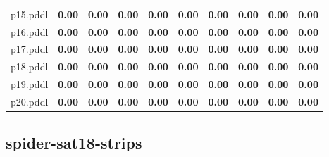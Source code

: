 \documentclass{article}
\begin{document}
\begin{tabular}{@{}lrrrrrrrrr@{}}
p15.pddl & \textbf{0.00} & \textbf{0.00} & \textbf{0.00} & \textbf{0.00} & \textbf{0.00} & \textbf{0.00} & \textbf{0.00} & \textbf{0.00} & \textbf{0.00} \\
p16.pddl & \textbf{0.00} & \textbf{0.00} & \textbf{0.00} & \textbf{0.00} & \textbf{0.00} & \textbf{0.00} & \textbf{0.00} & \textbf{0.00} & \textbf{0.00} \\
p17.pddl & \textbf{0.00} & \textbf{0.00} & \textbf{0.00} & \textbf{0.00} & \textbf{0.00} & \textbf{0.00} & \textbf{0.00} & \textbf{0.00} & \textbf{0.00} \\
p18.pddl & \textbf{0.00} & \textbf{0.00} & \textbf{0.00} & \textbf{0.00} & \textbf{0.00} & \textbf{0.00} & \textbf{0.00} & \textbf{0.00} & \textbf{0.00} \\
p19.pddl & \textbf{0.00} & \textbf{0.00} & \textbf{0.00} & \textbf{0.00} & \textbf{0.00} & \textbf{0.00} & \textbf{0.00} & \textbf{0.00} & \textbf{0.00} \\
p20.pddl & \textbf{0.00} & \textbf{0.00} & \textbf{0.00} & \textbf{0.00} & \textbf{0.00} & \textbf{0.00} & \textbf{0.00} & \textbf{0.00} & \textbf{0.00} \\
\end{tabular}

\hypertarget{quality-spider-sat18-strips}{}
\subsection*{spider-sat18-strips}
\end{document}
